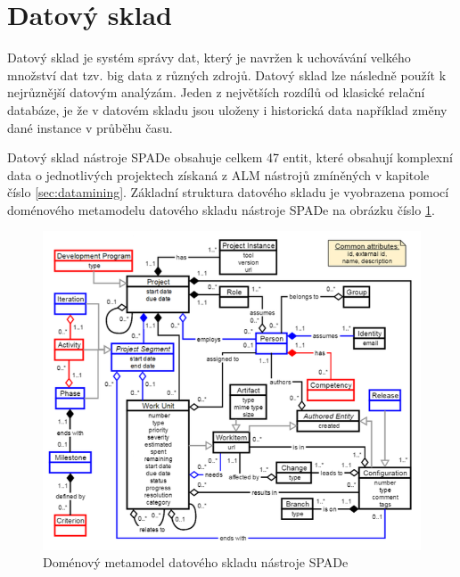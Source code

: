 \documentclass[czech,DP]{thesiskiv}
\begin{document}
\section{Datový sklad}\label{sec:datawarehouse}
Datový sklad je systém správy dat, který je navržen k uchovávání velkého množství dat tzv. big data z různých zdrojů. Datový sklad lze následně použít k nejrůznější datovým analýzám. Jeden z největších rozdílů od klasické relační databáze, je že v datovém skladu jsou uloženy i historická data například změny dané instance v průběhu času. \cite{datawarehouse}
\par
Datový sklad nástroje SPADe obsahuje celkem 47 entit, které obsahují komplexní data o jednotlivých projektech získaná z ALM nástrojů zmíněných v kapitole číslo \ref{sec:datamining}. Základní struktura datového skladu je vyobrazena pomocí doménového metamodelu datového skladu nástroje SPADe na obrázku číslo \ref{img:spade_datawarehouse}.
\begin{figure}[!htb]
    \centering
    \includegraphics[width=\textwidth]{img/spade_data_model.png}
    \caption{Doménový metamodel datového skladu nástroje SPADe \cite{picha}}
    \label{img:spade_datawarehouse}
\end{figure}
\FloatBarrier
\end{document}
